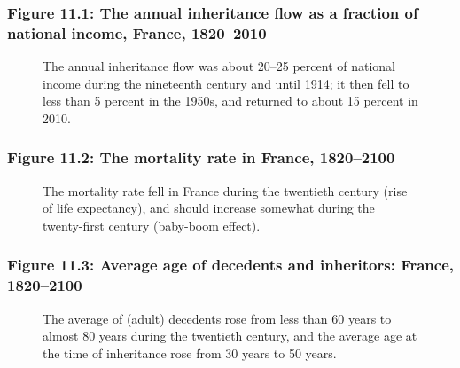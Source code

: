 \documentclass[t]{beamer}\usepackage[]{graphicx}\usepackage[]{color}
\begin{document}
\begin{frame}[label=Figure_11_1]
\frametitle{Figure 11.1: The annual inheritance flow as a fraction of national income, France, 1820--2010}
\begin{figure}[t]
\begin{minipage}[b]{\textwidth}
\centering

\caption{The annual inheritance flow was about 20–25 percent of national income during the nineteenth century and until 1914; it then fell to less than 5 percent in the 1950s, and returned to about 15 percent in 2010.}
\end{minipage}
\end{figure}
\end{frame}


\begin{frame}[label=Figure_11_2]
\frametitle{Figure 11.2: The mortality rate in France, 1820--2100}
\begin{figure}[t]
\begin{minipage}[b]{\textwidth}
\centering

\caption{The mortality rate fell in France during the twentieth century (rise of life expectancy), and should increase somewhat during the twenty-first century (baby-boom effect).}
\end{minipage}
\end{figure}
\end{frame}


\begin{frame}[label=Figure_11_3]
\frametitle{Figure 11.3: Average age of decedents and inheritors: France, 1820--2100}
\begin{figure}[t]
\begin{minipage}[b]{\textwidth}
\centering

\caption{The average of (adult) decedents rose from less than 60 years to almost 80 years during the twentieth century, and the average age at the time of inheritance rose from 30 years to 50 years.}
\end{minipage}
\end{figure}
\end{frame}
\end{document}
